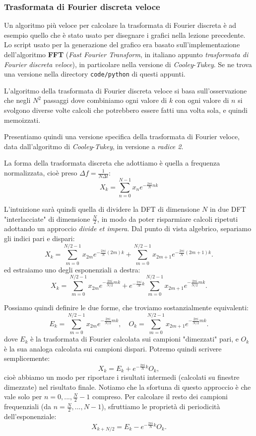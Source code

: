\documentclass[a4paper,11pt]{article}
\begin{document}
\subsubsection{Trasformata di Fourier discreta veloce}
Un algoritmo più veloce per calcolare la trasformata di Fourier discreta è ad esempio quello che è stato usato per disegnare i grafici nella lezione precedente. Lo script usato per la generazione del grafico era basato sull'implementazione dell'algoritmo \textbf{FFT} (\textit{Fast Fourier Transform}, in italiano appunto \textit{trasformata di Fourier discreta veloce}), in particolare nella versione di \textit{Cooley}-\textit{Tukey}. Se ne trova una versione nella directory \texttt{code/python} di questi appunti.

L'algoritmo della trasformata di Fourier discreta veloce si basa sull'osservazione che negli $N^2$ passaggi dove combiniamo ogni valore di $k$ con ogni valore di $n$ si svolgono diverse volte calcoli che potrebbero essere fatti una volta sola, e quindi memoizzati. 

Presentiamo quindi una versione specifica della trasformata di Fourier veloce, data dall'algoritmo di \textit{Cooley}-\textit{Tukey}, in versione a \textit{radice 2}.

La forma della trasformata discreta che adottiamo è quella a frequenza normalizzata, cioè preso $\Delta f = \frac{1}{N \Delta t}$:
$$
X_k = \sum_{n=0}^{N-1} x_n e^{- \frac{2\pi i}{N} nk}
$$

L'intuizione sarà quindi quella di dividere la DFT di dimensione $N$ in due DFT "interlacciate" di dimensione $\frac{N}{2}$, in modo da poter risparmiare calcoli ripetuti adottando un approccio \textit{divide et impera}. Dal punto di vista algebrico, separiamo gli indici pari e dispari:
$$
X_k =
\sum_{m=0}^{N/2-1} x_{2m} e^{- \frac{2\pi i}{N}(2m)k}
+
\sum_{m=0}^{N/2-1} x_{2m+1} e^{- \frac{2\pi i}{N}(2m+1)k}.
$$
ed estraiamo uno degli esponenziali a destra:
$$
X_k =
\sum_{m=0}^{N/2-1} x_{2m} e^{- \frac{2\pi i}{N/2} mk}
+
e^{- \frac{2\pi i}{N} k}
\sum_{m=0}^{N/2-1} x_{2m+1} e^{- \frac{2\pi i}{N/2} mk}.
$$

Possiamo quindi definire le due forme, che troviamo sostanzialmente equivalenti:
$$
E_k = \sum_{m=0}^{N/2-1} x_{2m} e^{- \frac{2\pi i}{N/2} mk}, \quad
O_k = \sum_{m=0}^{N/2-1} x_{2m+1} e^{- \frac{2\pi i}{N/2} mk}.
$$
dove $E_k$ è la trasformata di Fourier calcolata sui campioni "dimezzati" pari, e $O_k$ è la sua analoga calcolata sui campioni dispari. Potremo quindi scrivere semplicemente: 
$$
X_k = E_k + e^{- \frac{2\pi i}{N} k} O_k,
$$
cioè abbiamo un modo per riportare i risultati intermedi (calcolati su finestre dimezzate) nel risultato finale. Notiamo che la sfortuna di questo approccio è che vale solo per $n = 0, ..., \frac{N}{2} - 1$ compreso. Per calcolare il resto dei campioni frequenziali (da $n = \frac{N}{2}, ..., N - 1$), sfruttiamo le proprietà di periodicità dell'esponenziale:
$$
X_{k + N/2} = E_k - e^{- \frac{2\pi i}{N} k} O_k.
$$
\end{document}
